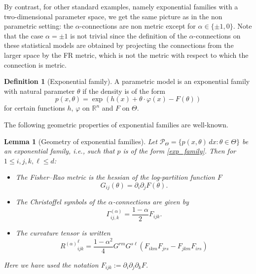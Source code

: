 \documentclass[11pt,reqno]{amsart}
\newtheorem{lemma}[theorem]{Lemma}
\theoremstyle{definition}
\newtheorem{definition}[theorem]{Definition}
\newcommand{\R}{\mathbb R}
\begin{document}
By contrast, for other standard examples, namely exponential families with a two-dimensional parameter space, we get the same picture as in the non parametric setting: the $\alpha$-connections are non metric except for $\alpha\in\{\pm 1,0\}$. Note that the case $\alpha=\pm 1$ is not trivial since the definition of the $\alpha$-connections on these statistical models are obtained by projecting the connections from the larger space by the FR metric, which is not the metric with respect to which the connection is metric. 
\begin{definition}[Exponential family]
A parametric model is an exponential family with natural parameter $\theta$ if the density is of the form
\begin{equation}\label{exp_family}
p(x,\theta)=\exp(h(x)+\theta\cdot\varphi(x)-F(\theta))
\end{equation}
for certain functions $h$, $\varphi$ on $\R^n$ and $F$ on $\Theta$.
\end{definition}
%
The following geometric properties of exponential families are well-known. 
\begin{lemma}[Geometry of exponential families]\label{lem:exponential}
Let $\mathcal P_\Theta = \{p(x,\theta)\,dx: \theta\in\Theta\}$ be an exponential family, i.e., such that $p$ is of the form \eqref{exp_family}. Then for $1\leq i,j,k,\ell\leq d$:
\begin{itemize}
\item The Fisher--Rao metric is the hessian of the log-partition function $F$
\begin{equation}\label{exp_fisher_rao}
G_{ij}(\theta)=\partial_i\partial_j F(\theta).
\end{equation}
\item The Christoffel symbols of the $\alpha$-connections are given by
\begin{equation}\label{exp_alpha}
\Gamma^{(\alpha)}_{ij,k}=\frac{1-\alpha}{2}F_{ijk}.
\end{equation}
\item The curvature tensor is written
\begin{equation}\label{exp_alpha_curv}{R^{(\alpha)}}_{ijk}^\ell=\frac{1-\alpha^2}{4}G^{rm}G^{s\ell}\left(F_{ikm}F_{jrs}-F_{jkm}F_{irs}\right)
\end{equation}
\end{itemize}
Here we have used the notation $F_{ijk}:=\partial_i\partial_j\partial_kF$.
\end{lemma}
%
\end{document}
